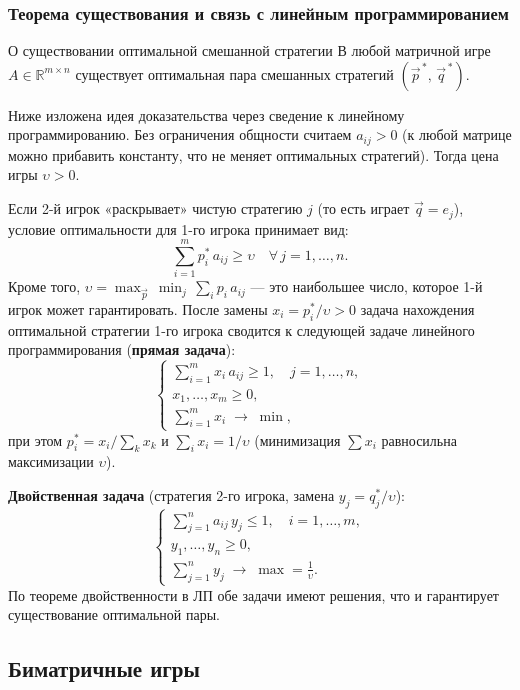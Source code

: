 \subsubsection*{Теорема существования и связь с линейным программированием}

\begin{Theorem}{О существовании оптимальной смешанной стратегии}{}
	В любой матричной игре $A \in \mathbb{R}^{m \times n}$ существует оптимальная пара смешанных стратегий $(\vec{p}^{\,*},\, \vec{q}^{\,*})$.
\end{Theorem}

Ниже изложена идея доказательства через сведение к линейному программированию. Без ограничения общности считаем $a_{ij} > 0$ (к любой матрице можно прибавить константу, что не меняет оптимальных стратегий). Тогда цена игры $\upsilon > 0$.

Если 2-й игрок «раскрывает» чистую стратегию $j$ (то есть играет $\vec{q} = e_j$), условие оптимальности для 1-го игрока принимает вид:
\[
\sum_{i=1}^m p_i^*\, a_{ij} \geq \upsilon \quad \forall\, j = 1,\ldots,n.
\]
Кроме того, $\upsilon = \max_{\vec{p}}\, \min_{j}\, \sum_i p_i\, a_{ij}$ --- это наибольшее число, которое 1-й игрок может гарантировать. После замены $x_i = p_i^*/\upsilon > 0$ задача нахождения оптимальной стратегии 1-го игрока сводится к следующей задаче линейного программирования (\textbf{прямая задача}):
\[
\begin{cases}
	\displaystyle\sum_{i=1}^m x_i\, a_{ij} \geq 1, \quad j = 1,\ldots, n, \\[4pt]
	x_1, \ldots, x_m \geq 0, \\[2pt]
	\displaystyle\sum_{i=1}^m x_i \;\longrightarrow\; \min,
\end{cases}
\]
при этом $p_i^* = x_i / \sum_k x_k$ и $\sum_i x_i = 1/\upsilon$ (минимизация $\sum x_i$ равносильна максимизации $\upsilon$).

\textbf{Двойственная задача} (стратегия 2-го игрока, замена $y_j = q_j^*/\upsilon$):
\[
\begin{cases}
	\displaystyle\sum_{j=1}^n a_{ij}\, y_j \leq 1, \quad i = 1,\ldots, m, \\[4pt]
	y_1, \ldots, y_n \geq 0, \\[2pt]
	\displaystyle\sum_{j=1}^n y_j \;\longrightarrow\; \max = \tfrac{1}{\upsilon}.
\end{cases}
\]
По теореме двойственности в ЛП обе задачи имеют решения, что и гарантирует существование оптимальной пары.

\subsection{Биматричные игры}

